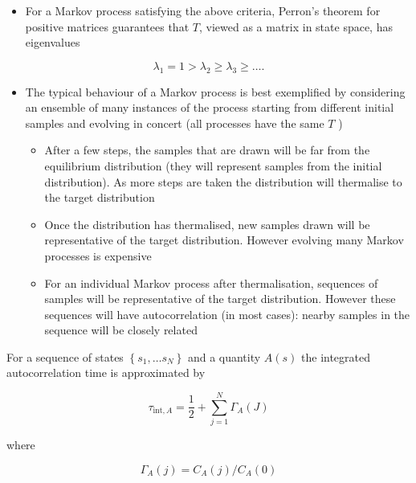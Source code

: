 \begin{itemize}
  \item For a Markov process satisfying the above criteria, Perron's theorem  for positive matrices guarantees that $T$, viewed as a matrix in state space, has eigenvalues
\end{itemize}

\begin{equation}
\lambda_{1}=1>\lambda_{2} \geqslant \lambda_{3} \geqslant \ldots .
\end{equation}

\begin{itemize}
  \item The typical behaviour of a Markov process is best exemplified by considering an ensemble of many instances of the process starting from different initial samples and evolving in concert (all processes have the same \(T\) )
  \begin{itemize}
  \item After a few steps, the samples that are drawn will be far from the equilibrium distribution (they will represent samples from the initial distribution). As more steps are taken the distribution will thermalise to the target distribution
  \item Once the distribution has thermalised, new samples drawn will be representative of the target distribution. However evolving many Markov processes is expensive
  \item For an individual Markov process after thermalisation, sequences of samples will be representative of the target distribution. However these sequences will have autocorrelation (in most cases): nearby samples in the sequence will be closely related
  \end{itemize}
\end{itemize}

For a sequence of states \(\left\{s_{1}, \ldots  s_{N}\right\}\) and a quantity \(A(s)\) the integrated autocorrelation time is approximated by

\begin{equation}
\tau_{\text {int}, A}=\frac{1}{2}+\sum_{j=1}^{N} \Gamma_{A}(J)
\end{equation}

where

\begin{equation}
\Gamma_{A}(j)=C_{A}(j) / C_{A}(0)
\end{equation}

